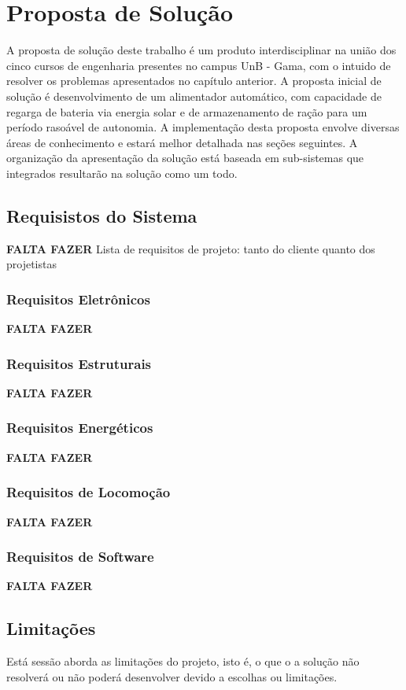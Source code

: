 \chapter[Proposta de Solução]{Proposta de Solução}\label{cap2}

A proposta de solução deste trabalho é um produto interdisciplinar na união dos cinco cursos de engenharia presentes no campus UnB - Gama, com o intuido de resolver os problemas apresentados no capítulo anterior. A proposta inicial de solução é desenvolvimento de um alimentador automático, com capacidade de regarga de bateria via energia solar e de armazenamento de ração para um período rasoável de autonomia. A implementação desta proposta envolve diversas áreas de conhecimento e estará melhor detalhada nas seções seguintes.
A organização da apresentação da solução está baseada em sub-sistemas que integrados resultarão na solução como um todo.

\section{Requisistos do Sistema}
\textbf{FALTA FAZER}
Lista de requisitos de projeto: tanto do cliente quanto dos projetistas
\subsection{Requisitos Eletrônicos}
\textbf{FALTA FAZER}
\subsection{Requisitos Estruturais}
\textbf{FALTA FAZER}
\subsection{Requisitos Energéticos}
\textbf{FALTA FAZER}
\subsection{Requisitos de Locomoção}
\textbf{FALTA FAZER}
\subsection{Requisitos de Software}
\textbf{FALTA FAZER}

\section{Limitações}
Está sessão aborda as limitações do projeto, isto é, o que o a solução não resolverá ou não poderá desenvolver
devido a escolhas ou limitações.

